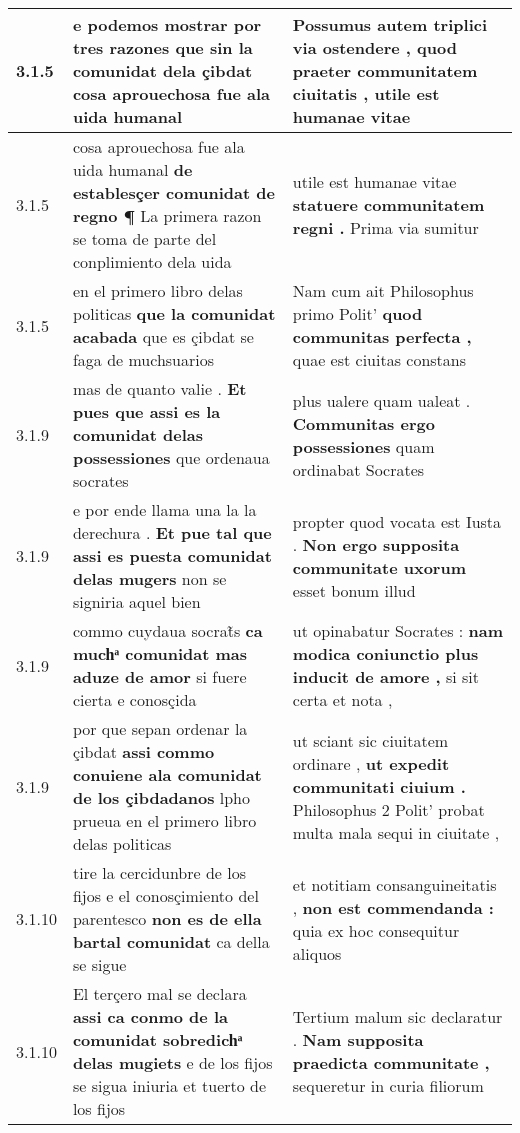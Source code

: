 \begin{tabular}{|p{1cm}|p{6.5cm}|p{6.5cm}|}
3.1.5 & e podemos mostrar por tres razones \textbf{ que sin la comunidat dela çibdat } cosa aprouechosa fue ala uida humanal & Possumus autem triplici via ostendere , \textbf{ quod praeter communitatem ciuitatis , } utile est humanae vitae \\\hline
3.1.5 & cosa aprouechosa fue ala uida humanal \textbf{ de establesçer comunidat de regno ¶ } La primera razon se toma de parte del conplimiento dela uida & utile est humanae vitae \textbf{ statuere communitatem regni . } Prima via sumitur \\\hline
3.1.5 & en el primero libro delas politicas \textbf{ que la comunidat acabada } que es çibdat se faga de muchsuarios & Nam cum ait Philosophus primo Polit’ \textbf{ quod communitas perfecta , } quae est ciuitas constans \\\hline
3.1.9 & mas de quanto valie . \textbf{ Et pues que assi es la comunidat delas possessiones } que ordenaua socrates & plus ualere quam ualeat . \textbf{ Communitas ergo possessiones } quam ordinabat Socrates \\\hline
3.1.9 & e por ende llama una la la derechura . \textbf{ Et pue tal que assi es puesta comunidat delas mugers } non se signiria aquel bien & propter quod vocata est Iusta . \textbf{ Non ergo supposita communitate uxorum } esset bonum illud \\\hline
3.1.9 & commo cuydaua socrat̃s \textbf{ ca muchͣ comunidat mas aduze de amor } si fuere cierta e conosçida & ut opinabatur Socrates : \textbf{ nam modica coniunctio plus inducit de amore , } si sit certa et nota , \\\hline
3.1.9 & por que sepan ordenar la çibdat \textbf{ assi commo conuiene ala comunidat de los çibdadanos } lpho prueua en el primero libro delas politicas & ut sciant sic ciuitatem ordinare , \textbf{ ut expedit communitati ciuium . } Philosophus 2 Polit’ probat multa mala sequi in ciuitate , \\\hline
3.1.10 & tire la cercidunbre de los fijos e el conosçimiento del parentesco \textbf{ non es de ella bartal comunidat } ca della se sigue & et notitiam consanguineitatis , \textbf{ non est commendanda : } quia ex hoc consequitur aliquos \\\hline
3.1.10 & El terçero mal se declara \textbf{ assi ca conmo de la comunidat sobredichͣ delas mugiets } e de los fijos se sigua iniuria et tuerto de los fijos & Tertium malum sic declaratur . \textbf{ Nam supposita praedicta communitate , } sequeretur in curia filiorum \\\hline

\end{tabular}
